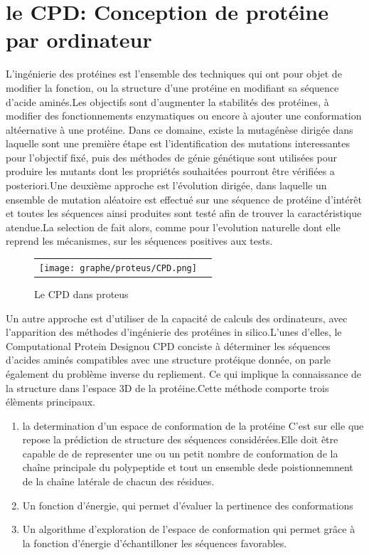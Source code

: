 
\chapter{le \og CPD\fg: Conception de protéine par ordinateur}
\label{chap:CPD}

L'ingénierie des protéines est l'ensemble des techniques qui ont pour objet de modifier la fonction, ou la structure d'une protéine en modifiant sa séquence d'acide aminés.Les objectifs sont d'augmenter la stabilités des protéines, à modifier des fonctionnements enzymatiques ou encore à ajouter une conformation altéernative à une protéine.
Dans ce domaine, existe la mutagénèse dirigée dans laquelle sont une première étape est l'identification des mutations interessantes pour l'objectif fixé, puis des méthodes de génie génétique sont utilisées pour produire les mutants dont les propriétés souhaitées pourront être vérifiées a posteriori.Une deuxième approche est l'évolution dirigée, dans laquelle un ensemble de mutation aléatoire est effectué sur une séquence de protéine d'intérêt et toutes les séquences ainsi produites sont testé afin de trouver la caractéristique atendue.La selection de fait alors, comme pour l'evolution naturelle dont elle reprend les mécanismes, sur les séquences positives aux tests.


   \begin{figure}[t]
     \centering
     \begin{tabular}{cc}
       \texttt{[image: graphe/proteus/CPD.png]} &
     \end{tabular}
     
     \caption{Le CPD dans proteus}
\label{graph:struct_Phy}
   \end{figure}


Un autre approche est d'utiliser de la capacité de calculs des ordinateurs, avec l'apparition des méthodes d'ingénierie des protéines \og in silico\fg.L'unes d'elles, le \og Computational Protein Design\fg ou CPD conciste à déterminer les séquences d'acides aminés compatibles avec une structure protéique donnée, on parle également du problème inverse du repliement. Ce qui implique la connaissance de la structure dans l'espace 3D de la protéine.Cette méthode comporte trois élèments principaux.

\begin{enumerate}
\item la determination d'un espace de conformation de la protéine
  C'est sur elle que repose la prédiction de structure des séquences considérées.Elle doit être capable de de representer une ou un petit nombre de conformation de la chaîne principale du polypeptide et tout un ensemble dede poistionnemnent de la chaîne latérale de chacun des résidues.
\item Un fonction d'énergie, qui permet d'évaluer la pertinence des conformations 
\item Un algorithme d'exploration de l'espace de conformation qui permet grâce à la fonction d'énergie d'échantilloner les séquences favorables.
  
\end{enumerate}

